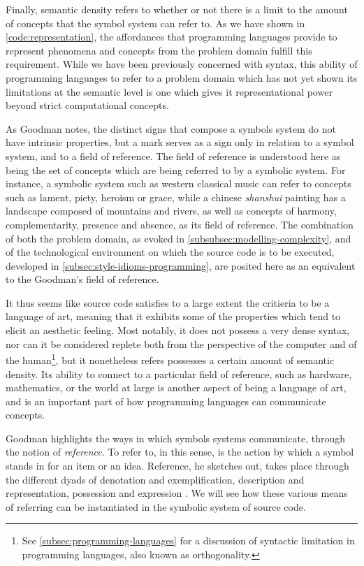 Finally, semantic density refers to whether or not there is a limit to the amount of concepts that the symbol system can refer to. As we have shown in \ref{code:representation}, the affordances that programming languages provide to represent phenomena and concepts from the problem domain fulfill this requirement. While we have been previously concerned with syntax, this ability of programming languages to refer to a problem domain which has not yet shown its limitations at the semantic level is one which gives it representational power beyond strict computational concepts.

As Goodman notes, the distinct signs that compose a symbols system do not have intrinsic properties, but a mark serves as a sign only in relation to a symbol system, and to a field of reference. The field of reference is understood here as being the set of concepts which are being referred to by a symbolic system. For instance, a symbolic system such as western classical music can refer to concepts such as lament, piety, heroism or grace, while a chinese \emph{shanshui} painting has a landscape composed of mountains and rivers, as well as concepts of harmony, complementarity, presence and absence, as its field of reference. The combination of both the problem domain, as evoked in \ref{subsubsec:modelling-complexity}, and of the technological environment on which the source code is to be executed, developed in \ref{subsec:style-idioms-programming}, are posited here as an equivalent to the Goodman's field of reference.

It thus seems like source code satisfies to a large extent the critieria to be a language of art, meaning that it exhibits some of the properties which tend to elicit an aesthetic feeling. Most notably, it does not possess a very dense syntax, nor can it be considered replete both from the perspective of the computer and of the human\footnote{See \ref{subsec:programming-languages} for a discussion of syntactic limitation in programming languages, also known as orthogonality.}, but it nonetheless refers possesses a certain amount of semantic density. Its ability to connect to a particular field of reference, such as hardware, mathematics, or the world at large is another aspect of being a language of art, and is an important part of how programming languages can communicate concepts.

Goodman highlights the ways in which symbols systems communicate, through the notion of \emph{reference}. To refer to, in this sense, is the action by which a symbol stands in for an item or an idea. Reference, he sketches out, takes place through the different dyads of denotation and exemplification, description and representation, possession and expression \citep{goodman_languages_1976}. We will see how these various means of referring can be instantiated in the symbolic system of source code.

